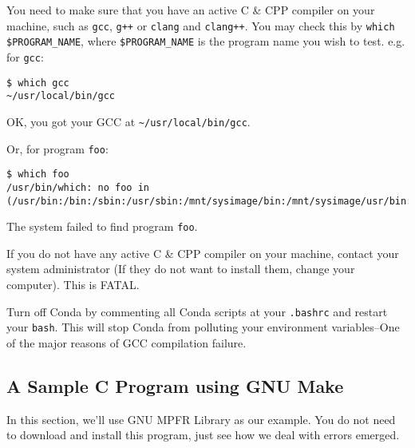 \documentclass[]{article}
\begin{document}
You need to make sure that you have an active C \& CPP compiler on your machine, such as \verb|gcc|, \verb|g++| or \verb|clang| and \verb|clang++|. You may check this by \verb|which $PROGRAM_NAME|, where \verb|$PROGRAM_NAME| is the program name you wish to test. e.g. for \verb|gcc|:
\begin{verbatim}
$ which gcc
~/usr/local/bin/gcc
\end{verbatim}
OK, you got your GCC at \verb|~/usr/local/bin/gcc|.

Or, for program \verb|foo|:
\begin{verbatim}
$ which foo
/usr/bin/which: no foo in (/usr/bin:/bin:/sbin:/usr/sbin:/mnt/sysimage/bin:/mnt/sysimage/usr/bin:/mnt/sysimage/usr/sbin:/mnt/sysimage/sbin:/sbin:/usr/sbin:)
\end{verbatim}

The system failed to find program \verb|foo|.

If you do not have any active C \& CPP compiler on your machine, contact your system administrator (If they do not want to install them, change your computer). This is {\color{red}FATAL}.

Turn off Conda by commenting all Conda scripts at your \verb|.bashrc| and restart your \verb|bash|. This will stop Conda from polluting your environment variables--One of the major reasons of GCC compilation failure.

\subsection{A Sample C Program using GNU Make}

In this section, we'll use GNU MPFR Library as our example. You do not need to download and install this program, just see how we deal with errors emerged.
\end{document}
